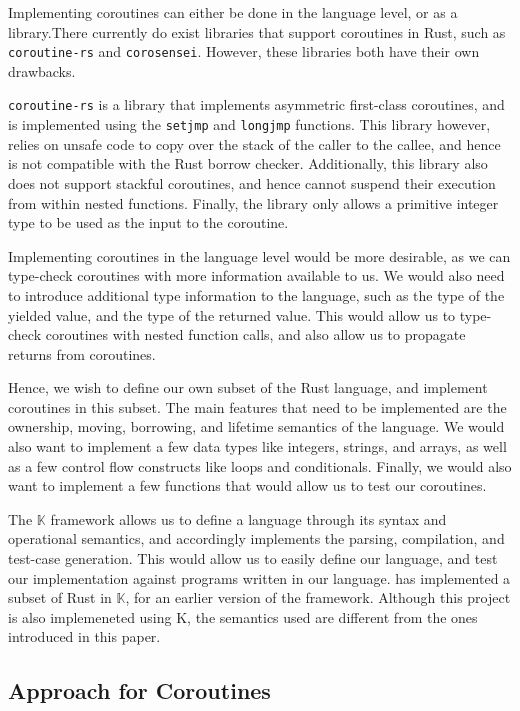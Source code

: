 \documentclass[review,twocolumn]{sigplanconf}
\begin{document}
Implementing coroutines can either be done in the language level, or as a library.There currently do exist libraries that support coroutines in Rust, such as \verb!coroutine-rs! and \verb!corosensei!. However, these libraries both have their own drawbacks.

\verb!coroutine-rs! is a library that implements asymmetric first-class coroutines, and is implemented using the \verb!setjmp! and \verb!longjmp! functions. This library however, relies on unsafe code to copy over the stack of the caller to the callee, and hence is not compatible with the Rust borrow checker. Additionally, this library also does not support stackful coroutines, and hence cannot suspend their execution from within nested functions. Finally, the library only allows a primitive integer type to be used as the input to the coroutine.

Implementing coroutines in the language level would be more desirable, as we can type-check coroutines with more information available to us. We would also need to introduce additional type information to the language, such as the type of the yielded value, and the type of the returned value. This would allow us to type-check coroutines with nested function calls, and also allow us to propagate returns from coroutines.

Hence, we wish to define our own subset of the Rust language, and implement coroutines in this subset. The main features that need to be implemented are the ownership, moving, borrowing, and lifetime semantics of the language. We would also want to implement a few data types like integers, strings, and arrays, as well as a few control flow constructs like loops and conditionals. Finally, we would also want to implement a few functions that would allow us to test our coroutines.

The $\mathbb{K}$ framework allows us to define a language through its syntax and operational semantics, and accordingly implements the parsing, compilation, and test-case generation. This would allow us to easily define our language, and test our implementation against programs written in our language. \citet{Krust2018} has implemented a subset of Rust in $\mathbb{K}$, for an earlier version of the framework. Although this project is also implemeneted using K, the semantics used are different from the ones introduced in this paper.

\subsection{Approach for Coroutines}
\end{document}
